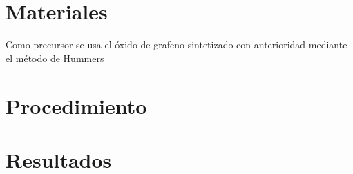 \section{Materiales}
Como precursor se usa el óxido de grafeno sintetizado con anterioridad mediante el método de Hummers
\section{Procedimiento}

\section{Resultados}